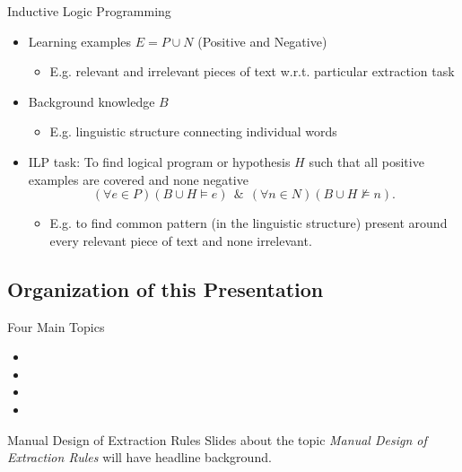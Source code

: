 \documentclass[xcolor=dvipsnames]{beamer}
\begin{document}
\begin{frame}{Inductive Logic Programming}
\begin{itemize}
	\item Learning examples $E=P\cup N$ (Positive and Negative)	
	\begin{itemize}
		\item E.g. relevant and irrelevant pieces of text w.r.t. particular extraction task
	\end{itemize}	
	\item Background knowledge $B$
	\begin{itemize}
		\item E.g. linguistic structure connecting individual words
	\end{itemize}	
	\item ILP task: To find logical program or hypothesis $H$ such that all positive examples are covered and none negative
$$
(\forall e\in P)(B\cup H\models e) \ \ \&\  \ (\forall n\in N)(B\cup H\not\models n).
$$
	\begin{itemize}
		\item E.g. to find common pattern (in the linguistic structure) present around every relevant piece of text and none irrelevant.
	\end{itemize}	
\end{itemize}
\end{frame}


\subsection{Organization of this Presentation} 
\frame{\tableofcontents[currentsubsection]}

\begin{frame}{Four Main Topics}

\begin{itemize}
	\item {}
	\item {}
	\item {}
	\item {}
\end{itemize}

\end{frame}


\begin{frame}{Manual Design of Extraction Rules}
Slides about the topic \emph{Manual Design of Extraction Rules} will have   headline background.
\end{frame}
\end{document}
